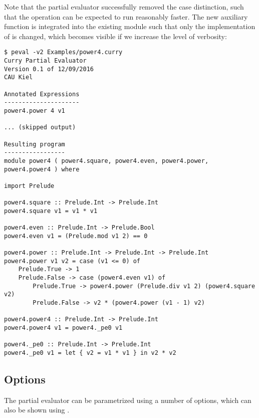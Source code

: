 Note that the partial evaluator successfully removed the case distinction,
such that the operation  can be expected to run reasonably faster.
The new auxiliary function  is integrated into the
existing module such that only the implementation of  is changed,
which becomes visible if we increase the level of verbosity:
\begin{lstlisting}[mathescape=false]
$ peval -v2 Examples/power4.curry
Curry Partial Evaluator
Version 0.1 of 12/09/2016
CAU Kiel

Annotated Expressions
---------------------
power4.power 4 v1

... (skipped output)

Resulting program
-----------------
module power4 ( power4.square, power4.even, power4.power, power4.power4 ) where

import Prelude

power4.square :: Prelude.Int -> Prelude.Int
power4.square v1 = v1 * v1

power4.even :: Prelude.Int -> Prelude.Bool
power4.even v1 = (Prelude.mod v1 2) == 0

power4.power :: Prelude.Int -> Prelude.Int -> Prelude.Int
power4.power v1 v2 = case (v1 <= 0) of
    Prelude.True -> 1
    Prelude.False -> case (power4.even v1) of
        Prelude.True -> power4.power (Prelude.div v1 2) (power4.square v2)
        Prelude.False -> v2 * (power4.power (v1 - 1) v2)

power4.power4 :: Prelude.Int -> Prelude.Int
power4.power4 v1 = power4._pe0 v1

power4._pe0 :: Prelude.Int -> Prelude.Int
power4._pe0 v1 = let { v2 = v1 * v1 } in v2 * v2
\end{lstlisting}

\subsection{Options}

The partial evaluator can be parametrized using a number of options,
which can also be shown using .

